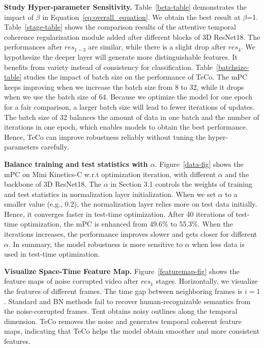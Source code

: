 \documentclass{article} %
\begin{document}
\textbf{Study Hyper-parameter Sensitivity.} Table~\ref{beta-table} demonstrates the impact of $\beta$ in Equation~\ref{eq:overall_equation}. We obtain the best result at $\beta$=1. Table~\ref{stage-table} shows the comparison results of the attentive temporal coherence regularization module added after different blocks of 3D ResNet18. The performances after $res_{1-3}$ are similar, while there is a slight drop after $res_{4}$. We hypothesize the deeper layer will generate more distinguishable features. It benefits from variety instead of consistency for classification. Table~\ref{batchsize-table} studies the impact of batch size on the performance of TeCo. The mPC keeps improving when we increase the batch size from 8 to 32, while it drops when we use the batch size of 64.
Because we optimize the model for one epoch for a fair comparison, a larger batch size will lead to fewer iterations of updates. The batch size of 32 balances the amount of data in one batch and the number of iterations in one epoch, which enables models to obtain the best performance. Hence, TeCo can improve robustness reliably without tuning the hyper-parameters carefully.  

\textbf{Balance training and test statistics with $\alpha$}. Figure~\ref{data-fig} shows the mPC on Mini Kinetics-C w.r.t optimization iteration, with different $\alpha$ and the backbone of 3D ResNet18. The $\alpha$ in Section 3.1 controls the weights of training and test statistics in normalization layer initialization. When we set $\alpha$ to a smaller value (e.g., 0.2), the normalization layer relies more on test data initially. Hence, it converges faster in test-time optimization. After 40 iterations of test-time optimization, the mPC is enhanced from 49.6\% to 55.3\%. When the iterations increases, the performance improves slower and gets closer for different $\alpha$. In summary, the model robustness is more sensitive to $\alpha$ when less data is used in test-time optimization.

\textbf{Visualize Space-Time Feature Map.}
Figure~\ref{featuremap-fig} shows the feature maps of noise corrupted video after $res_{1}$ stages. Horizontally, we visualize the features of different frames. 
The time gap between neighboring frames is $i=1$. 
Standard and BN methods fail to recover human-recognizable semantics from the noise-corrupted frames. 
Tent obtains noisy outlines along the temporal dimension. 
TeCo removes the noise and generates temporal coherent feature maps, indicating that TeCo helps the model obtain smoother and more consistent features.    
\end{document}

